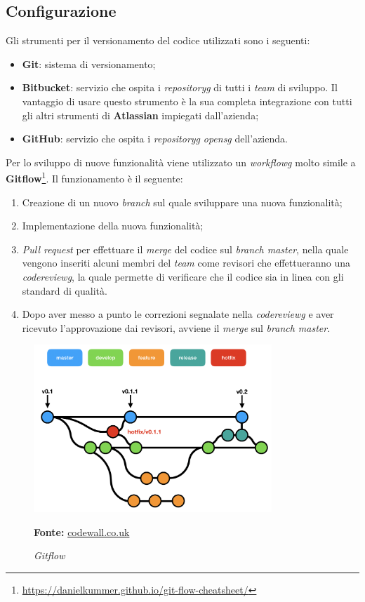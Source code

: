 \subsection{Configurazione}\label{sec:configurazione}
Gli strumenti per il versionamento del codice utilizzati sono i seguenti:
\begin{itemize}
    \item \textbf{Git}: sistema di versionamento;
    \item \textbf{Bitbucket}: servizio che ospita i \textit{\gls{repositoryg}} di tutti i \textit{team} di sviluppo. Il vantaggio di usare questo strumento è la sua completa integrazione con tutti gli altri strumenti di \textbf{Atlassian} impiegati dall'azienda;
    \item \textbf{GitHub}: servizio che ospita i \textit{\gls{repositoryg}} \textit{\gls{opensg}} dell'azienda.
\end{itemize}
Per lo sviluppo di nuove funzionalità viene utilizzato un \textit{\gls{workflowg}} molto simile a \textbf{Gitflow}\footnote{\url{https://danielkummer.github.io/git-flow-cheatsheet/}}. Il funzionamento è il seguente:
\begin{enumerate}
    \item Creazione di un nuovo \textit{branch} sul quale sviluppare una nuova funzionalità;
    \item Implementazione della nuova funzionalità;
    \item \textit{Pull request} per effettuare il \textit{merge} del codice sul \textit{branch master}, nella quale vengono inseriti alcuni membri del \textit{team} come revisori che effettueranno una \textit{\gls{codereviewg}}, la quale permette di verificare che il codice sia in linea con gli standard di qualità.
    \item Dopo aver messo a punto le correzioni segnalate nella \textit{\gls{codereviewg}} e aver ricevuto l'approvazione dai revisori, avviene il \textit{merge} sul \textit{branch master}.
\end{enumerate}
    \begin{figure}[ht]
        \centering
        \includegraphics[width=0.8\textwidth]{immagini/git_flow.png}
        \caption{\textit{Gitflow}}
        \textbf{Fonte:} \href{https://www.codewall.co.uk/a-git-flow-explainer-how-to-tutorial/}{codewall.co.uk}
        \label{fig: Gitflow}
    \end{figure}

